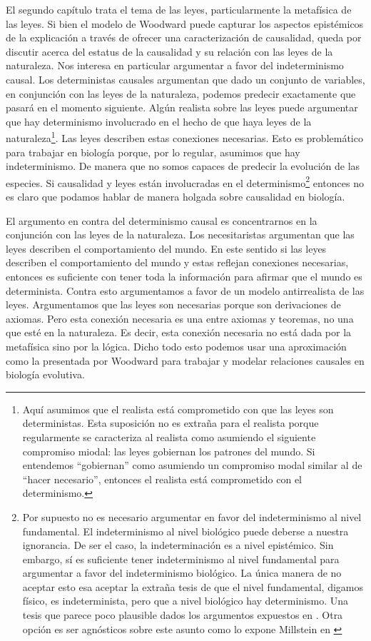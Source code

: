 El segundo capítulo trata el tema de las leyes, particularmente la metafísica de las leyes. Si bien el modelo de Woodward puede capturar los aspectos epistémicos de la explicación a través de ofrecer una caracterización de causalidad, queda por discutir acerca del estatus de la causalidad y su relación con las leyes de la naturaleza. Nos interesa en particular argumentar a favor del indeterminismo causal. Los deterministas causales argumentan que dado un conjunto de variables, en conjunción con las leyes de la naturaleza, podemos predecir exactamente que pasará en el momento siguiente. Algún realista sobre las leyes puede argumentar que hay determinismo involucrado en el hecho de que haya leyes de la naturaleza\footnote{Aquí asumimos que el realista está comprometido con que las leyes son deterministas. Esta suposición no es extraña para el realista porque regularmente se caracteriza al realista como asumiendo el siguiente compromiso miodal: las leyes gobiernan los patrones del mundo. Si entendemos ``gobiernan'' como asumiendo un compromiso modal similar al de ``hacer necesario'', entonces el realista está comprometido con el determinismo.}. Las leyes describen estas conexiones necesarias. Esto es problemático para trabajar en biología porque, por lo regular, asumimos que hay indeterminismo. De manera que no somos capaces de predecir la evolución de las especies. Si causalidad y leyes están involucradas en el determinismo\footnote{Por supuesto no es necesario argumentar en favor del indeterminismo al nivel fundamental. El indeterminismo al nivel biológico puede deberse a nuestra ignorancia. De ser el caso, la indeterminación es a nivel epistémico. Sin embargo, sí es suficiente tener indeterminismo al nivel fundamental para argumentar a favor del indeterminismo biológico. La única manera de no aceptar esto esa aceptar la extraña tesis de que el nivel fundamental, digamos físico, es indeterminista, pero que a nivel biológico hay determinismo. Una tesis que parece poco plausible dados los argumentos expuestos en \cite{Graves1999}. Otra opción es ser agnósticos sobre este asunto como lo expone Millstein en \citeyear{pittphilsci4544}} entonces no es claro que podamos hablar de manera holgada sobre causalidad en biología.

El argumento en contra del determinismo causal es concentrarnos en la conjunción con las leyes de la naturaleza. Los necesitaristas argumentan que las leyes describen el comportamiento del mundo. En este sentido si las leyes describen el comportamiento del mundo y estas reflejan conexiones necesarias, entonces es suficiente con tener toda la información para afirmar que el mundo es determinista. Contra esto argumentamos a favor de un modelo antirrealista de las leyes. Argumentamos que las leyes son necesarias porque son derivaciones de axiomas. Pero esta conexión necesaria es una entre axiomas y teoremas, no una que esté en la naturaleza. Es decir, esta conexión necesaria no está dada por la metafísica sino por la lógica. Dicho todo esto podemos usar una aproximación como la presentada por Woodward para trabajar y modelar relaciones causales en biología evolutiva.


